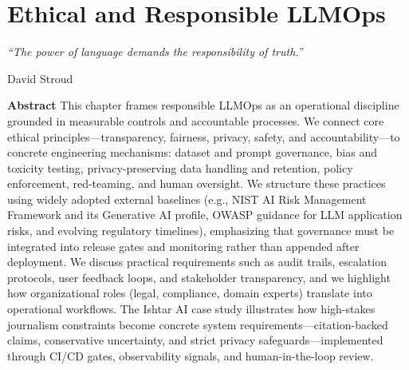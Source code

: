 \chapter{Ethical and Responsible LLMOps}
\label{ch:ethics}
\newrefsegment


\epigraph{\emph{``The power of language demands the responsibility of truth.''}}{David Stroud}

\textbf{Abstract} This chapter frames responsible LLMOps as an operational discipline grounded in measurable controls and accountable processes. We connect core ethical principles---transparency, fairness, privacy, safety, and accountability---to concrete engineering mechanisms: dataset and prompt governance, bias and toxicity testing, privacy-preserving data handling and retention, policy enforcement, red-teaming, and human oversight. We structure these practices using widely adopted external baselines (e.g., NIST AI Risk Management Framework and its Generative AI profile, OWASP guidance for LLM application risks, and evolving regulatory timelines), emphasizing that governance must be integrated into release gates and monitoring rather than appended after deployment. We discuss practical requirements such as audit trails, escalation protocols, user feedback loops, and stakeholder transparency, and we highlight how organizational roles (legal, compliance, domain experts) translate into operational workflows. The Ishtar AI case study illustrates how high-stakes journalism constraints become concrete system requirements---citation-backed claims, conservative uncertainty, and strict privacy safeguards---implemented through CI/CD gates, observability signals, and human-in-the-loop review.

